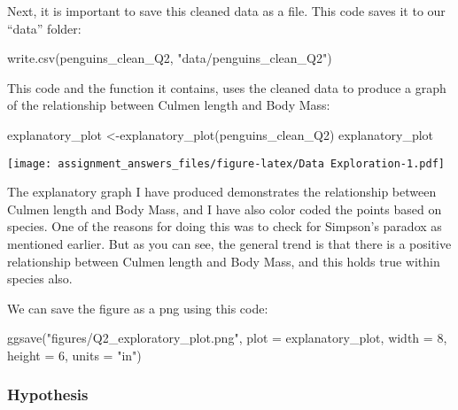\documentclass[
]{article}
\newenvironment{Shaded}{\begin{snugshade}}{\end{snugshade}}
\newcommand{\AttributeTok}[1]{\textcolor[rgb]{0.77,0.63,0.00}{#1}}
\newcommand{\DecValTok}[1]{\textcolor[rgb]{0.00,0.00,0.81}{#1}}
\newcommand{\FunctionTok}[1]{\textcolor[rgb]{0.00,0.00,0.00}{#1}}
\newcommand{\NormalTok}[1]{#1}
\newcommand{\OtherTok}[1]{\textcolor[rgb]{0.56,0.35,0.01}{#1}}
\newcommand{\StringTok}[1]{\textcolor[rgb]{0.31,0.60,0.02}{#1}}
\begin{document}
Next, it is important to save this cleaned data as a file. This code
saves it to our ``data'' folder:

\begin{Shaded}
\begin{Highlighting}[]
\FunctionTok{write.csv}\NormalTok{(penguins\_clean\_Q2, }\StringTok{"data/penguins\_clean\_Q2"}\NormalTok{)}
\end{Highlighting}
\end{Shaded}

This code and the function it contains, uses the cleaned data to produce
a graph of the relationship between Culmen length and Body Mass:

\begin{Shaded}
\begin{Highlighting}[]
\NormalTok{explanatory\_plot }\OtherTok{\textless{}{-}}\FunctionTok{explanatory\_plot}\NormalTok{(penguins\_clean\_Q2)}
\NormalTok{explanatory\_plot}
\end{Highlighting}
\end{Shaded}

\texttt{[image: assignment\_answers\_files/figure-latex/Data Exploration-1.pdf]}

The explanatory graph I have produced demonstrates the relationship
between Culmen length and Body Mass, and I have also color coded the
points based on species. One of the reasons for doing this was to check
for Simpson's paradox as mentioned earlier. But as you can see, the
general trend is that there is a positive relationship between Culmen
length and Body Mass, and this holds true within species also.

We can save the figure as a png using this code:

\begin{Shaded}
\begin{Highlighting}[]
\FunctionTok{ggsave}\NormalTok{(}\StringTok{"figures/Q2\_exploratory\_plot.png"}\NormalTok{, }\AttributeTok{plot =}\NormalTok{ explanatory\_plot, }\AttributeTok{width =} \DecValTok{8}\NormalTok{, }\AttributeTok{height =} \DecValTok{6}\NormalTok{, }\AttributeTok{units =} \StringTok{"in"}\NormalTok{)}
\end{Highlighting}
\end{Shaded}

\hypertarget{hypothesis}{%
\subsubsection{Hypothesis}\label{hypothesis}}
\end{document}
